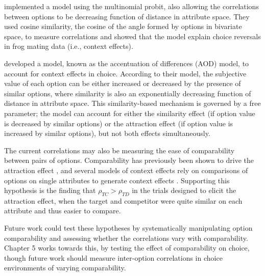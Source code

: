 \textcite{natenzon2019random} implemented a model using the multinomial probit, also allowing the correlations between options to be decreasing function of distance in attribute space. They used cosine similarity, the cosine of the angle formed by options in bivariate space, to measure correlations and showed that the model explain choice reversals in frog mating data (i.e., context effects). 

\textcite{spektor2019similarity} developed a model, known as the accentuation of differences (AOD) model, to account for context effects in choice. According to their model, the subjective value of each option can be either increased or decreased by the presence of similar options, where similarity is also an exponentially decreasing function of distance in attribute space. This similarity-based mechanism is governed by a free parameter; the model can account for either the similarity effect (if option value is decreased by similar options) or the attraction effect (if option value is increased by similar options), but not both effects simultaneously.

The current correlations may also be measuring the ease of comparability between pairs of options. Comparability has previously been shown to drive the attraction effect \parencite{noguchi2014attraction,cataldoComparisonProcessAccount2019b}, and several models of context effects rely on comparisons of options on single attributes to generate context effects \parencite{trueblood2014multiattribute,roeMultialternativeDecisionField2001a}. Supporting this hypothesis is the finding that $\rho_{TC}>\rho_{TD}$ in the trials designed to elicit the attraction effect, when the target and competitor were quite similar on each attribute and thus easier to compare.

Future work could test these hypotheses by systematically manipulating option comparability and assessing whether the correlations vary with comparability. Chapter 5 works towards this, by testing the effect of comparability on choice, though future work should measure inter-option correlations in choice environments of varying comparability. 
